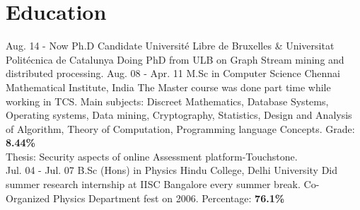 \documentclass[]{cv-class}
\begin{document}
\section{Education}
\begin{entrylist}
  \entry
    {Aug. 14 - Now}
    {Ph.D Candidate}
    {Universit\'{e} Libre de Bruxelles \&  Universitat Polit\'{e}cnica de Catalunya}
	{Doing PhD from ULB on Graph Stream mining and distributed processing.}
  \entry
    {Aug. 08 - Apr. 11}
    {M.Sc in Computer Science}
    {Chennai Mathematical Institute, India}
    {The Master course was done part time while working in TCS.
    Main subjects: Discreet Mathematics, Database Systems, Operating systems, Data mining, Cryptography, Statistics, Design and Analysis of Algorithm,
    Theory of Computation, Programming language Concepts. Grade: \textbf{8.44\%}\\
    Thesis: Security aspects of online Assessment platform-Touchstone.\\}
      \entry
    {Jul. 04 - Jul. 07}
    {B.Sc (Hons) in Physics}
    {Hindu College, Delhi University}
    {Did summer research internship at IISC Bangalore every summer break. Co-Organized Physics Department fest on 2006.
     Percentage: \textbf{76.1\%}\\}
\end{entrylist}
\end{document}
